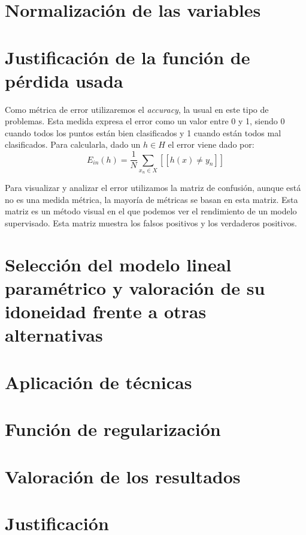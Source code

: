 \documentclass[size=a4, parskip=half, titlepage=false, toc=flat, toc=bib, 12pt]{scrartcl}
\begin{document}
\section{Normalización de las variables}
\section{Justificación de la función de pérdida usada}
Como métrica de error utilizaremos el \textit{accuracy}, la usual en este tipo de problemas. Esta medida expresa el error como un valor entre 0 y 1, siendo 0 cuando todos los puntos están bien clasificados y 1 cuando están todos mal clasificados. Para calcularla, dado un $h \in H$ el error viene dado por:
$$E_{in}(h) = \frac{1}{N} \sum_{x_n \in X} [[ h(x) \neq y_n]] $$

Para visualizar y analizar el error utilizamos la matriz de confusión, aunque está no es una medida métrica, la mayoría de métricas se basan en esta matriz. Esta matriz es un método visual en el que podemos ver el rendimiento de un modelo supervisado. Esta matriz muestra los falsos positivos y los verdaderos positivos.
\section{Selección del modelo lineal paramétrico y valoración de su idoneidad frente a otras alternativas}
\section{Aplicación de técnicas}
\section{Función de regularización}
\section{Valoración de los resultados}
\section{Justificación}

\end{document}
